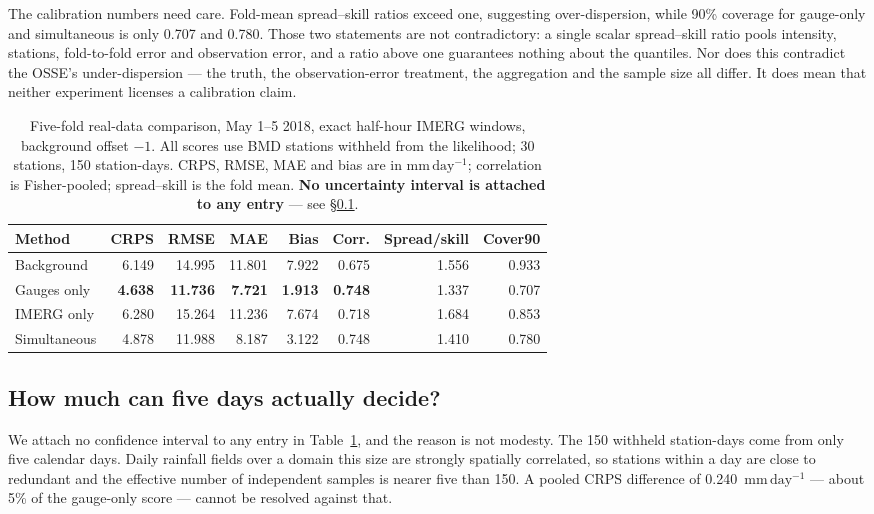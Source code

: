 \documentclass[10pt,twocolumn]{article}
\newcommand{\mmday}{\mathrm{mm\,day^{-1}}}
\begin{document}
The calibration numbers need care. Fold-mean spread--skill ratios exceed one,
suggesting over-dispersion, while 90\% coverage for gauge-only and simultaneous
is only 0.707 and 0.780. Those two statements are not contradictory: a single
scalar spread--skill ratio pools intensity, stations, fold-to-fold error and
observation error, and a ratio above one guarantees nothing about the
quantiles. Nor does this contradict the OSSE's under-dispersion --- the truth,
the observation-error treatment, the aggregation and the sample size all
differ. It does mean that neither experiment licenses a calibration claim.

\begin{table}[t]
\centering
\caption{Five-fold real-data comparison, May 1--5 2018, exact half-hour IMERG
windows, background offset $-1$. All scores use BMD stations withheld from the
likelihood; 30 stations, 150 station-days. CRPS, RMSE, MAE and bias are in
$\mmday$; correlation is Fisher-pooled; spread--skill is the fold mean.
\textbf{No uncertainty interval is attached to any entry} --- see
\S\ref{sec:power}.}
\label{tab:real}
\small
\begin{tabular}{lrrrrrrr}
\toprule
Method & CRPS & RMSE & MAE & Bias & Corr. & Spread/skill & Cover90 \\
\midrule
Background   & 6.149 & 14.995 & 11.801 & 7.922 & 0.675 & 1.556 & 0.933 \\
Gauges only  & \textbf{4.638} & \textbf{11.736} & \textbf{7.721} & \textbf{1.913} & \textbf{0.748} & 1.337 & 0.707 \\
IMERG only   & 6.280 & 15.264 & 11.236 & 7.674 & 0.718 & 1.684 & 0.853 \\
Simultaneous & 4.878 & 11.988 & 8.187 & 3.122 & 0.748 & 1.410 & 0.780 \\
\bottomrule
\end{tabular}
\end{table}

\subsection{How much can five days actually decide?}
\label{sec:power}

We attach no confidence interval to any entry in Table~\ref{tab:real}, and the
reason is not modesty. The 150 withheld station-days come from only five
calendar days. Daily rainfall fields over a domain this size are strongly
spatially correlated, so stations within a day are close to redundant and the
effective number of independent samples is nearer five than 150. A pooled CRPS
difference of 0.240~$\mmday$ --- about 5\% of the gauge-only score --- cannot
be resolved against that.
\end{document}
